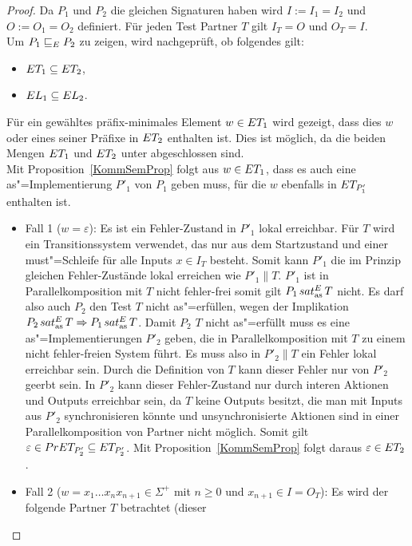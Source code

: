\begin{proof}
  Da $P_1$ und $P_2$ die gleichen Signaturen haben wird $I:=I_1=I_2$ und $O:=
  O_1=O_2$ definiert. Für jeden Test Partner $T$ gilt $I_T=O$ und $O_T=I$.\\
  Um $P_1 \sqsubseteq  _E P_2$ zu zeigen, wird nachgeprüft, ob folgendes gilt:
  \begin{itemize}
    \item $ET _1\subseteq ET _2$,
    \item $EL _1\subseteq EL _2$.
  \end{itemize}
  Für ein gewähltes präfix-minimales Element $w\in ET _1$ wird gezeigt, dass
  dies $w$ oder eines seiner Präfixe in $ET _2$ enthalten ist. Dies ist
  möglich, da die beiden Mengen $ET _1$ und $ET _2$ unter \cont{}
  abgeschlossen sind.\\
  Mit Proposition~\ref{KommSemProp} folgt aus $w\in ET _1$, dass es auch eine
  as"=Implementierung $P'_1$ von $P_1$ geben muss, für die $w$ ebenfalls in
  $ET _{P'_1}$ enthalten ist.
  \begin{itemize}
    \item Fall 1 ($w=\varepsilon$): Es ist ein Fehler-Zustand in $P'_1$ lokal
      erreichbar. Für $T$ wird ein Transitionssystem verwendet, das nur aus dem
      Startzustand und einer must"=Schleife für alle Inputs $x\in I_T$ besteht.
      Somit kann $P'_1$ die im Prinzip gleichen Fehler-Zustände lokal
      erreichen wie $P'_1\|T$. $P'_1$ ist in Parallelkomposition mit $T$ nicht
      fehler-frei somit gilt $P_1\hspace{0.05cm}sat_\mathrm{as}^E\hspace{0.05cm} T$ nicht. Es darf also auch $P_2$ den
      Test $T$ nicht as"=erfüllen, wegen der Implikation $P_2\hspace{0.05cm}sat_\mathrm{as}^E\hspace{0.05cm} T
      \Rightarrow P_1\hspace{0.05cm}sat_\mathrm{as}^E\hspace{0.05cm} T$. Damit $P_2$ $T$ nicht as"=erfüllt muss es eine
      as"=Implementierungen $P'_2$ geben, die in Parallelkomposition mit $T$ zu
      einem nicht fehler-freien System führt. Es muss also in $P'_2\|T$ ein
      Fehler lokal erreichbar sein. Durch die Definition von $T$ kann dieser
      Fehler nur von $P'_2$ geerbt sein. In $P'_2$ kann dieser Fehler-Zustand
      nur durch interen Aktionen und Outputs erreichbar sein, da $T$ keine
      Outputs besitzt, die man mit Inputs aus $P'_2$ synchronisieren könnte und
      unsynchronisierte Aktionen sind in einer Parallelkomposition von Partner
      nicht möglich. Somit gilt $\varepsilon\in PrET _{P'_2}\subseteq ET
      _{P'_2}$. Mit Proposition~\ref{KommSemProp} folgt daraus $\varepsilon\in
      ET _2$.
    \item Fall 2 ($w=x_1\dots x_n x_{n+1}\in\Sigma ^+$ mit $n\geq 0$ und
      $x_{n+1}\in I=O_T$): Es wird der folgende Partner $T$ betrachtet (dieser

\end{itemize}
\end{proof}
